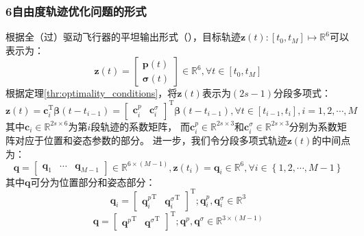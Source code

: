 \subsubsection{6自由度轨迹优化问题的形式}\label{subsubsec:form_of_6dof_trajectory_optimization_problem}
根据全（过）驱动飞行器的平坦输出形式（），目标轨迹$\bm{z}(t):[t_0,t_M]\mapsto\mathbb{R}^6$可以表示为：
\begin{equation}
  \bm{z}(t) = 
  \begin{bmatrix}
    \bm{p}(t) \\ \bm{\sigma}(t)
  \end{bmatrix} \in \mathbb{R}^6, \forall t \in [t_0, t_M]
  \label{equ:objective_6dof_trajectory}
\end{equation}
根据定理\ref{thr:optimality_conditions}，将$\bm{z}(t)$表示为$(2s-1)$分段多项式：
\begin{equation}
  \bm{z}(t) = \bm{c}_i^{\text{T}}\bm{\beta}(t-t_{i-1}) = 
  \begin{bmatrix}
      \bm{c}_i^{p} & \bm{c}_i^{\sigma}
  \end{bmatrix}^{\text{T}}\bm{\beta}(t-t_{i-1}),\forall t \in [t_{i-1},t_i],i=1,2,\cdots,M
  \label{equ:piecewise_6dof_poly_traj}
\end{equation}
其中$\bm{c}_i\in\mathbb{R}^{2s\times6}$为第$i$段轨迹的系数矩阵，
而$\bm{c}_i^{p}\in\mathbb{R}^{2s\times3}$和$\bm{c}_i^{\sigma}\in\mathbb{R}^{2s\times3}$分别为系数矩阵对应于位置和姿态参数的部分。
进一步，我们令分段多项式轨迹$\bm{z}(t)$的中间点为：
    \begin{equation}
        \bm{q} = 
        \begin{bmatrix}
            \bm{q}_1 & \cdots & \bm{q}_{M-1}
        \end{bmatrix} \in \mathbb{R}^{6\times(M-1)}, 
        \bm{z}(t_i) = \bm{q}_i \in \mathbb{R}^{6}, \forall i \in \left\{1, 2, \cdots, M-1\right\}
    \end{equation}
其中$\bm{q}$可分为位置部分和姿态部分：
    \begin{equation}
        \bm{q}_i = 
        \begin{bmatrix}
            {\bm{q}_{i}^{p}}^{\text{T}} & {\bm{q}_{i}^{\sigma}}^{\text{T}}
        \end{bmatrix}^{\text{T}};{\bm{q}_{i}^{p}},{\bm{q}_{i}^{\sigma}} \in \mathbb{R}^3
    \end{equation}
    \begin{equation}
        \bm{q} = 
        \begin{bmatrix}
            {\bm{q}^{p}}^{\text{T}} & {\bm{q}^{\sigma}}^{\text{T}}
        \end{bmatrix}^{\text{T}};{\bm{q}^{p}},{\bm{q}^{\sigma}} \in \mathbb{R}^{3\times{(M-1)}}
    \end{equation}


